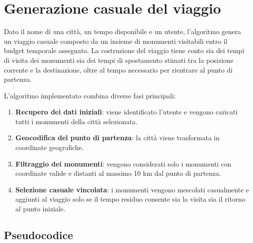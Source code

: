\section{Generazione casuale del viaggio}
\vspace{-5pt}
Dato il nome di una città, un tempo disponibile e un utente, l'algoritmo genera un viaggio casuale composto da un insieme di monumenti visitabili entro il budget temporale assegnato. 
La costruzione del viaggio tiene conto sia dei tempi di visita dei monumenti sia dei tempi di spostamento stimati tra la posizione corrente e la destinazione, oltre al tempo necessario per rientrare al punto di partenza.

L'algoritmo implementato combina diverse fasi principali:
\vspace{-5pt}
\begin{enumerate}
    \setlength{\itemsep}{0pt}
    \setlength{\parskip}{0pt}
    \item \textbf{Recupero dei dati iniziali}: viene identificato l'utente e vengono caricati tutti i monumenti della città selezionata.
    \item \textbf{Geocodifica del punto di partenza}: la città viene trasformata in coordinate geografiche.
    \item \textbf{Filtraggio dei monumenti}: vengono considerati solo i monumenti con coordinate valide e distanti al massimo 10 km dal punto di partenza.
    \item \textbf{Selezione casuale vincolata}: i monumenti vengono mescolati casualmente e aggiunti al viaggio solo se il tempo residuo consente sia la visita sia il ritorno al punto iniziale.
\end{enumerate}

\vspace{-10pt}
\subsection*{Pseudocodice}
\vspace{-5pt}

